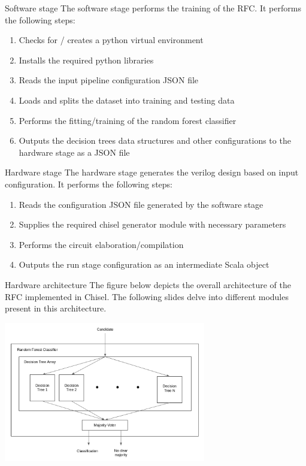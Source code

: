 \documentclass[presentation]{beamer}
\begin{document}
\begin{frame}[label={sec:org07acb6f}]{Software stage}
The software stage performs the training of the RFC. It performs the following steps:

\begin{enumerate}
\item Checks for / creates a python virtual environment
\item Installs the required python libraries
\item Reads the input pipeline configuration JSON file
\item Loads and splits the dataset into training and testing data
\item Performs the fitting/training of the random forest classifier
\item Outputs the decision trees data structures and other configurations to the hardware stage as a JSON file
\end{enumerate}
\end{frame}

\begin{frame}[label={sec:org5a8b9c0}]{Hardware stage}
The hardware stage generates the verilog design based on input configuration. It performs the following steps:

\begin{enumerate}
\item Reads the configuration JSON file generated by the software stage
\item Supplies the required chisel generator module with necessary parameters
\item Performs the circuit elaboration/compilation
\item Outputs the run stage configuration as an intermediate Scala object
\end{enumerate}
\end{frame}

\begin{frame}[label={sec:org6c43e30}]{Hardware architecture}
The figure below depicts the overall architecture of the RFC implemented in Chisel. The following slides delve into different modules present in this architecture.
\begin{center}
\includegraphics[width=250pt]{../images/architecture.png}
\end{center}
\end{frame}
\end{document}
